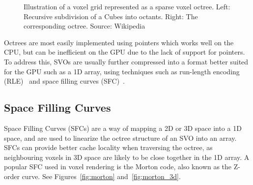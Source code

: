 \begin{figure}[thp]
    \begin{center}
    \end{center}
    \caption{Illustration of a voxel grid represented as a sparse voxel octree. Left: Recursive subdivision of a Cubes
        into octants. Right: The corresponding octree. Source: Wikipedia}
    \label{fig:octree}
\end{figure}

Octrees are most easily implemented using pointers which works well on the CPU, but can be inefficient on the GPU due to
the lack of support for pointers. To address this, SVOs are usually further compressed into a format better suited for the
GPU such as a 1D array, using techniques such as run-length encoding (RLE)~\cite{Eisenwave_RLE} and space filling curves
(SFC)~\cite{Eisenwave_SFC}.

\subsection{Space Filling Curves}
Space Filling Curves (SFCs) are a way of mapping a 2D or 3D space into a 1D space, and are used to linearize the octree
structure of an SVO into an array. SFCs can provide better cache locality when traversing the octree, as neighbouring
voxels in 3D space are likely to be close together in the 1D array. A popular SFC used in voxel rendering is the Morton
code, also known as the Z-order curve. See Figures~\ref{fig:morton} and~\ref{fig:morton_3d}.

